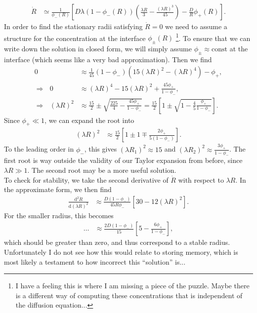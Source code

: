 \documentclass[english, parskip=full]{scrartcl}
\newcommand{\kla}{}
\newcommand{\klam}{}
\newcommand{\tecxt}{}
\begin{document}
\begin{align}
\dot{R} &\simeq \frac{1}{\phi_-(R)} \klam\left[ D\lambda(1-\phi_-(R)) \kla\left( \frac{\lambda R}{3} - \frac{(\lambda R)^3}{45} \right) - \frac{D}{R}\phi_+(R) \right].
\end{align}
In order to find the stationary radii satisfying $\dot{R} = 0$ we need to assume a structure for the concentration at the interface $\phi_\pm(R)$
\footnote{I have a feeling this is where I am missing a piece of the puzzle. 
Maybe there is a different way of computing these concentrations that is independent of the diffusion equation...}.
To ensure that we can write down the solution in closed form, we will simply assume $\phi_\pm \approx \tecxt\text{const}$ at the interface (which seems like a very bad approximation).
Then we find
\begin{align}
0 &\approx \frac{1}{45} (1 - \phi_-) \kla\left( 15 (\lambda R)^2 - (\lambda R)^4 \right) - \phi_+,\\
\Rightarrow\ \ \ 0 &\approx (\lambda R)^4 - 15 (\lambda R)^2 + \frac{45\phi_+}{1 - \phi_-},\\
\Rightarrow\ \ \ (\lambda R)^2 &\approx \frac{15}{2} \pm \sqrt{\frac{225}{4} - \frac{45\phi_+}{1 - \phi_-}} = \frac{15}{2} \klam\left[ 1 \pm \sqrt{1 - \frac{4}{5} \frac{\phi_+}{1 - \phi_-}} \right].
\end{align}
Since $\phi_+\ll 1$, we can expand the root into
\begin{align}
(\lambda R)^2 &\approx \frac{15}{2} \klam\left[ 1 \pm 1 \mp \frac{2\phi_+}{5(1 - \phi_-)} \right].
\end{align}
To the leading order in $\phi_-$, this gives $(\lambda R_1)^2 \approx 15$ and $(\lambda R_2)^2 \approx \frac{3\phi_+}{1-\phi_-}$.
The first root is way outside the validity of our Taylor expansion from before, since $\lambda R \gg 1$.
The second root may be a more useful solution.
\\
To check for stability, we take the second derivative of $\dot{R}$ with respect to $\lambda R$.
In the approximate form, we then find
\begin{align}
\frac{\tecxt\text{d}^2\dot{R}}{\tecxt\text{d}(\lambda R)^2} &\approx \frac{D(1-\phi_-)}{45R\phi_-} \klam\left[ 30 - 12(\lambda R)^2 \right].
\end{align}
For the smaller radius, this becomes
\begin{align}
\dots &\approx \frac{2D(1-\phi_-)}{15} \klam\left[ 5 - \frac{6\phi_+}{1 - \phi_-} \right],
\end{align}
which should be greater than zero, and thus correspond to a stable radius.
\\
Unfortunately I do not see how this would relate to storing memory, which is most likely a testament to how incorrect this ``solution'' is...
\end{document}
